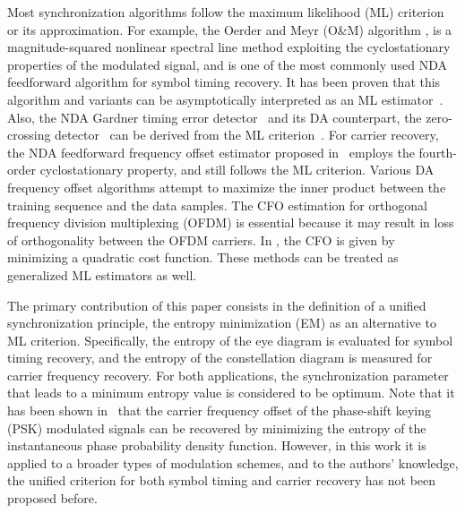 \documentclass[journal,comsoc]{IEEEtran}
\begin{document}
Most synchronization algorithms follow the maximum likelihood (ML) criterion or its approximation.
For example, the Oerder and Meyr (O\&M) algorithm \cite{Oerder1988}, is a magnitude-squared nonlinear spectral line method exploiting the cyclostationary properties of the modulated signal, 
and is one of the most commonly used NDA feedforward algorithm for symbol timing recovery.
It has been proven that this algorithm and variants can be asymptotically interpreted as an ML estimator~\cite{YanWang2002,Lopez-Salcedo2006}.
Also, the NDA Gardner timing error detector~\cite{Gardner1986} and its DA counterpart, the zero-crossing detector~\cite{gardner1988demodulator} can be derived from the ML criterion~\cite{Oerder1987}.
For carrier recovery, the NDA feedforward frequency offset estimator proposed in~\cite{Wang2004} employs the fourth-order cyclostationary property, and still follows the ML criterion.
Various DA frequency offset algorithms attempt to maximize the inner product between the  training sequence and the data samples.
The CFO estimation for orthogonal frequency division multiplexing (OFDM) is essential because it may result in loss of orthogonality between the OFDM carriers.
In  \cite{Li2006, Li2008, Amar2017LowCommunication},
% 
% 
the CFO is given by minimizing a quadratic cost function.
These methods can be treated as generalized ML estimators as well.

The primary contribution of this paper consists in the definition of a unified synchronization principle, the entropy minimization (EM) as an alternative to ML criterion. 
Specifically, the entropy of the eye diagram is evaluated for symbol timing recovery, and the entropy of the constellation diagram is measured for carrier frequency recovery.
For both applications, the synchronization parameter that leads to a minimum entropy value is considered to be optimum.
Note that it has been shown in~\cite{Pedzisz2006} that the carrier frequency offset of the phase-shift keying (PSK) modulated signals can be recovered by minimizing the entropy of the instantaneous phase probability density function.
However, in this work it is applied to a broader  types of modulation schemes, and to the authors' knowledge,  the unified criterion for both symbol timing and carrier recovery has not been proposed before. 
\end{document}
